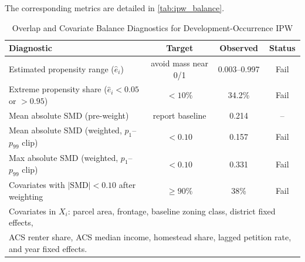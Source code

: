 

The corresponding metrics are detailed in \autoref{tab:ipw_balance}.

\begin{table}[H]
\centering
\caption{Overlap and Covariate Balance Diagnostics for Development-Occurrence IPW}
\label{tab:ipw_balance}
\begin{tabular}{lccc}
\toprule
\textbf{Diagnostic} & \textbf{Target} & \textbf{Observed} & \textbf{Status} \\
\midrule
Estimated propensity range ($\hat e_i$) & avoid mass near 0/1 & 0.003--0.997 & Fail \\
Extreme propensity share ($\hat e_i<0.05$ or $>0.95$) & $<10\%$ & 34.2\% & Fail \\
Mean absolute SMD (pre-weight) & report baseline & 0.214 & -- \\
Mean absolute SMD (weighted, $p_1$--$p_{99}$ clip) & $<0.10$ & 0.157 & Fail \\
Max absolute SMD (weighted, $p_1$--$p_{99}$ clip) & $<0.10$ & 0.331 & Fail \\
Covariates with $|\mathrm{SMD}|<0.10$ after weighting & $\ge 90\%$ & 38\% & Fail \\
\bottomrule
\multicolumn{4}{l}{\footnotesize Covariates in $X_i$: parcel area, frontage, baseline zoning class, district fixed effects,} \\
\multicolumn{4}{l}{\footnotesize ACS renter share, ACS median income, homestead share, lagged petition rate, and year fixed effects.} \\
\end{tabular}
\end{table}
